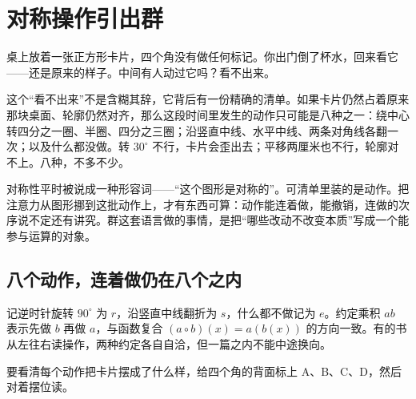 \section{对称操作引出群}
\label{sec:04-Discrete-Mathematics/06-Groups-and-Symmetry/01}

桌上放着一张正方形卡片，四个角没有做任何标记。你出门倒了杯水，回来看它——还是原来的样子。中间有人动过它吗？看不出来。

这个``看不出来''不是含糊其辞，它背后有一份精确的清单。如果卡片仍然占着原来那块桌面、轮廓仍然对齐，那么这段时间里发生的动作只可能是八种之一：绕中心转四分之一圈、半圈、四分之三圈；沿竖直中线、水平中线、两条对角线各翻一次；以及什么都没做。转 \(30^\circ\) 不行，卡片会歪出去；平移两厘米也不行，轮廓对不上。八种，不多不少。

对称性平时被说成一种形容词——``这个图形是对称的''。可清单里装的是动作。把注意力从图形挪到这批动作上，才有东西可算：动作能连着做，能撤销，连做的次序说不定还有讲究。群这套语言做的事情，是把``哪些改动不改变本质''写成一个能参与运算的对象。

\subsection{八个动作，连着做仍在八个之内}

记逆时针旋转 \(90^\circ\) 为 \(r\)，沿竖直中线翻折为 \(s\)，什么都不做记为 \(e\)。约定乘积 \(ab\) 表示先做 \(b\) 再做 \(a\)，与函数复合 \((a\circ b)(x)=a(b(x))\) 的方向一致。有的书从左往右读操作，两种约定各自自洽，但一篇之内不能中途换向。

要看清每个动作把卡片摆成了什么样，给四个角的背面标上 A、B、C、D，然后对着摆位读。

